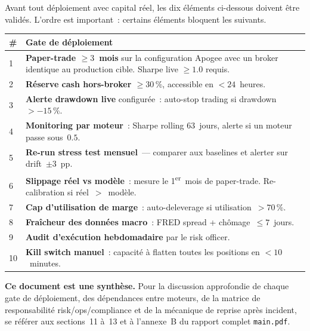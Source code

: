 \documentclass[11pt, a4paper]{scrartcl}
\begin{document}
Avant tout déploiement avec capital réel, les dix éléments ci-dessous doivent être
validés. L'ordre est important~: certains éléments bloquent les suivants.

\vspace{0.3em}

\begin{center}
\small
\begin{tabular}{@{}p{0.4cm}p{13.5cm}@{}}
\toprule
\textbf{\#} & \textbf{Gate de déploiement} \\
\midrule
1  & \textbf{Paper-trade $\geq 3$~mois} sur la configuration Apogee avec un broker
identique au production cible. Sharpe live $\geq 1.0$ requis. \\
2  & \textbf{Réserve cash hors-broker $\geq 30\,\%$}, accessible en $< 24$~heures. \\
3  & \textbf{Alerte drawdown live} configurée~: auto-stop trading si drawdown $>-15\,\%$. \\
4  & \textbf{Monitoring par moteur}~: Sharpe rolling 63~jours, alerte si un moteur
passe sous~$0.5$. \\
5  & \textbf{Re-run stress test mensuel}~--- comparer aux baselines et alerter sur
drift~$\pm 3$~pp. \\
6  & \textbf{Slippage réel vs modèle}~: mesure le 1\textsuperscript{er}~mois de
paper-trade. Re-calibration si réel~$>$~modèle. \\
7  & \textbf{Cap d'utilisation de marge}~: auto-deleverage si utilisation~$> 70\,\%$. \\
8  & \textbf{Fraîcheur des données macro}~: FRED spread + chômage~$\leq 7$~jours. \\
9  & \textbf{Audit d'exécution hebdomadaire} par le risk officer. \\
10 & \textbf{Kill switch manuel}~: capacité à flatten toutes les positions en
$< 10$~minutes. \\
\bottomrule
\end{tabular}
\end{center}

\vspace{0.3em}

\begin{warningbox}
\textbf{Ce document est une synthèse.} Pour la discussion approfondie de chaque
gate de déploiement, des dépendances entre moteurs, de la matrice de responsabilité
risk/ops/compliance et de la mécanique de reprise après incident, se référer aux
sections~11 à~13 et à l'annexe~B du rapport complet \texttt{main.pdf}.
\end{warningbox}
\end{document}

